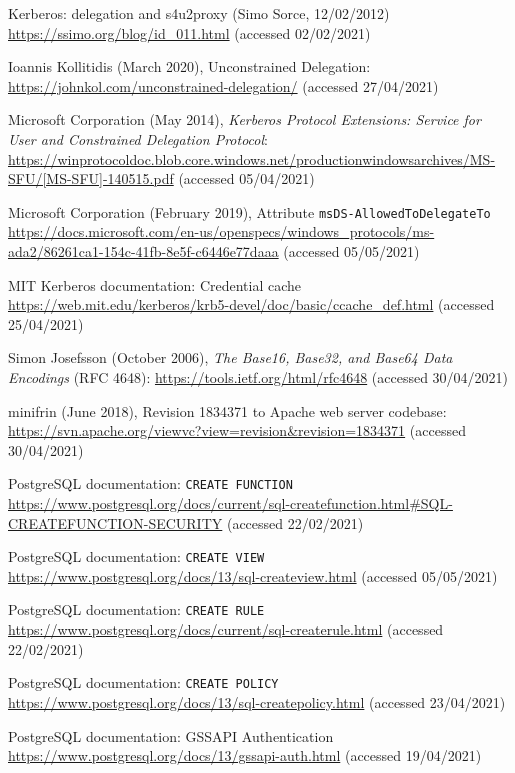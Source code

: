 \documentclass{report}
\begin{document}
\begin{thebibliography}{99}
 Kerberos: delegation and s4u2proxy (Simo Sorce, 12/02/2012) \url{https://ssimo.org/blog/id_011.html} (accessed 02/02/2021)

 Ioannis Kollitidis (March 2020), Unconstrained Delegation: \url{https://johnkol.com/unconstrained-delegation/} (accessed 27/04/2021)

 Microsoft Corporation (May 2014), \textit{Kerberos Protocol Extensions: Service for User and Constrained Delegation Protocol}: \url{https://winprotocoldoc.blob.core.windows.net/productionwindowsarchives/MS-SFU/[MS-SFU]-140515.pdf} (accessed 05/04/2021)

 Microsoft Corporation (February 2019), Attribute \texttt{msDS-AllowedToDelegateTo} \url{https://docs.microsoft.com/en-us/openspecs/windows_protocols/ms-ada2/86261ca1-154c-41fb-8e5f-c6446e77daaa} (accessed 05/05/2021)

 MIT Kerberos documentation: Credential cache \url{https://web.mit.edu/kerberos/krb5-devel/doc/basic/ccache_def.html} (accessed 25/04/2021)

 Simon Josefsson (October 2006), \textit{The Base16, Base32, and Base64 Data Encodings} (RFC 4648): \url{https://tools.ietf.org/html/rfc4648} (accessed 30/04/2021)

 minifrin (June 2018), Revision 1834371 to Apache web server codebase: \url{https://svn.apache.org/viewvc?view=revision&revision=1834371} (accessed 30/04/2021)

 PostgreSQL documentation: \texttt{CREATE FUNCTION} \url{https://www.postgresql.org/docs/current/sql-createfunction.html#SQL-CREATEFUNCTION-SECURITY} (accessed 22/02/2021)

 PostgreSQL documentation: \texttt{CREATE VIEW} \url{https://www.postgresql.org/docs/13/sql-createview.html} (accessed 05/05/2021)

 PostgreSQL documentation: \texttt{CREATE RULE} \url{https://www.postgresql.org/docs/current/sql-createrule.html} (accessed 22/02/2021)

 PostgreSQL documentation: \texttt{CREATE POLICY} \url{https://www.postgresql.org/docs/13/sql-createpolicy.html} (accessed 23/04/2021)

 PostgreSQL documentation: GSSAPI Authentication \url{https://www.postgresql.org/docs/13/gssapi-auth.html} (accessed 19/04/2021)


\end{thebibliography}
\end{document}

